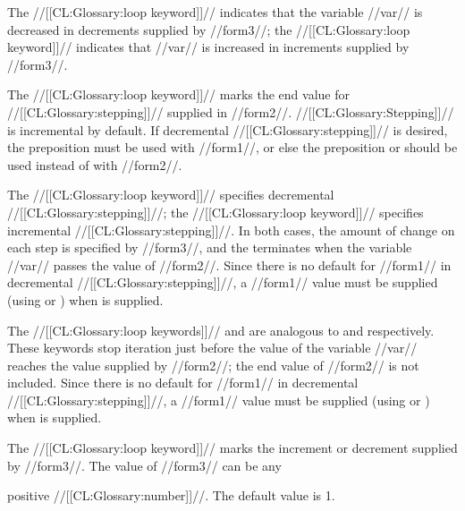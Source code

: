  
The //[[CL:Glossary:loop keyword]]//  
indicates that the variable //var// is decreased in decrements
supplied by //form3//; the //[[CL:Glossary:loop keyword]]//  indicates that 
//var// is increased in increments supplied by //form3//.
 
                                                  
The //[[CL:Glossary:loop keyword]]//  marks the end value
for //[[CL:Glossary:stepping]]// supplied in //form2//.
//[[CL:Glossary:Stepping]]// is incremental by default.
If decremental //[[CL:Glossary:stepping]]// is desired, 
the preposition  must be used with //form1//,
or else the preposition  or  should be used instead
   of  with //form2//.
              
 
The //[[CL:Glossary:loop keyword]]//  specifies decremental //[[CL:Glossary:stepping]]//;
the //[[CL:Glossary:loop keyword]]//  specifies incremental //[[CL:Glossary:stepping]]//.
In both cases, the amount of change on each step is specified by //form3//,
and the  terminates when the variable //var// passes 
the value of //form2//.
Since there is no default for //form1// in decremental //[[CL:Glossary:stepping]]//,
a //form1// value must be supplied (using  or )
when  is supplied.
 
 
The //[[CL:Glossary:loop keywords]]//  and  are analogous to
 and  respectively.  These keywords stop
iteration just before the value of the variable //var// reaches the value 
supplied by //form2//; the end value of //form2// is not included.
Since there is no default for //form1// in decremental //[[CL:Glossary:stepping]]//,
a //form1// value must be supplied (using  or )
when  is supplied.
 
 
The //[[CL:Glossary:loop keyword]]//  marks the increment or decrement supplied by
//form3//.  The value of //form3// can be any 

positive 
//[[CL:Glossary:number]]//.
The default value is 1.
 
